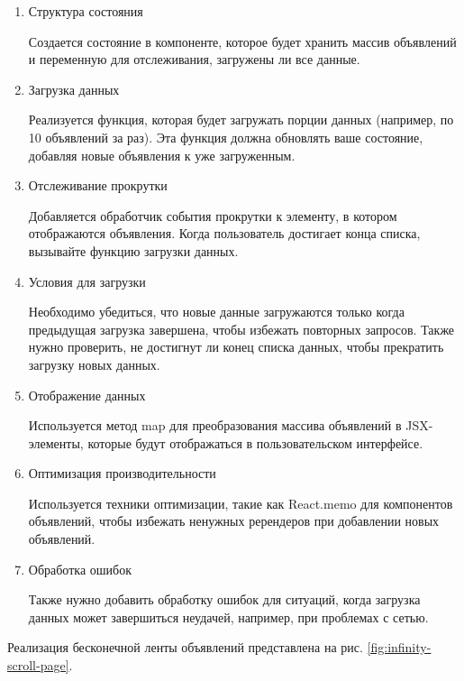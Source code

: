 \begin{enumerate}
	\item Структура состояния
	
	Создается состояние в компоненте, которое будет хранить массив объявлений и переменную для отслеживания, загружены ли все данные.
	
	\item Загрузка данных
	
	Реализуется функция, которая будет загружать порции данных (например, по 10 объявлений за раз). Эта функция должна обновлять ваше состояние, добавляя новые объявления к уже загруженным.
	
	\item Отслеживание прокрутки
	
	Добавляется обработчик события прокрутки к элементу, в котором отображаются объявления. Когда пользователь достигает конца списка, вызывайте функцию загрузки данных.
	
	\item Условия для загрузки
	
	Необходимо убедиться, что новые данные загружаются только когда предыдущая загрузка завершена, чтобы избежать повторных запросов. Также нужно проверить, не достигнут ли конец списка данных, чтобы прекратить загрузку новых данных.
	
	\item Отображение данных
	
	Используется метод map для преобразования массива объявлений в JSX-элементы, которые будут отображаться в пользовательском интерфейсе.
	
	\item Оптимизация производительности
	
	Используется техники оптимизации, такие как React.memo для компонентов объявлений, чтобы избежать ненужных ререндеров при добавлении новых объявлений.
	
	\item Обработка ошибок
	
	Также нужно добавить обработку ошибок для ситуаций, когда загрузка данных может завершиться неудачей, например, при проблемах с сетью.
\end{enumerate}

Реализация бесконечной ленты объявлений представлена на рис. \ref{fig:infinity-scroll-page}.

